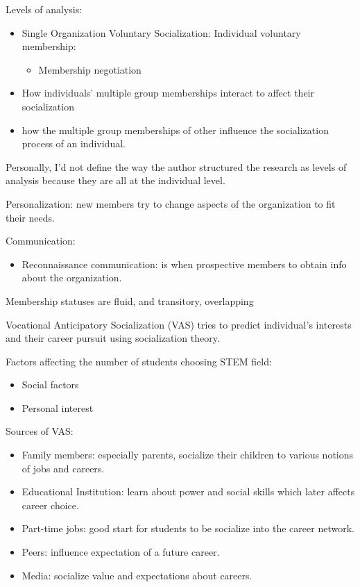 \documentclass[
]{book}
\providecommand{\tightlist}{%
  \setlength{\itemsep}{0pt}\setlength{\parskip}{0pt}}
\begin{document}
Levels of analysis:

\begin{itemize}
\item
  Single Organization Voluntary Socialization: Individual voluntary membership:

  \begin{itemize}
  \tightlist
  \item
    Membership negotiation
  \end{itemize}
\item
  How individuals' multiple group memberships interact to affect their socialization
\item
  how the multiple group memberships of other influence the socialization process of an individual.
\end{itemize}

Personally, I'd not define the way the author structured the research as levels of analysis because they are all at the individual level.

Personalization: new members try to change aspects of the organization to fit their needs.

Communication:

\begin{itemize}
\tightlist
\item
  Reconnaissance communication: is when prospective members to obtain info about the organization.
\end{itemize}

Membership statuses are fluid, and transitory, overlapping

\citep{Myers_2010}

Vocational Anticipatory Socialization (VAS) tries to predict individual's interests and their career pursuit using socialization theory.

Factors affecting the number of students choosing STEM field:

\begin{itemize}
\tightlist
\item
  Social factors
\item
  Personal interest
\end{itemize}

Sources of VAS:

\begin{itemize}
\tightlist
\item
  Family members: especially parents, socialize their children to various notions of jobs and careers.
\item
  Educational Institution: learn about power and social skills which later affects career choice.
\item
  Part-time jobs: good start for students to be socialize into the career network.
\item
  Peers: influence expectation of a future career.
\item
  Media: socialize value and expectations about careers.
\end{itemize}
\end{document}
